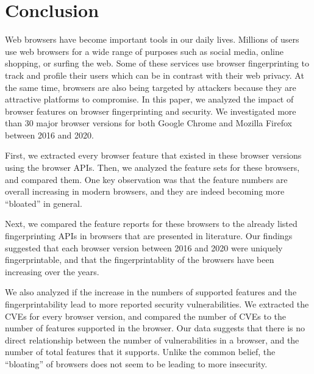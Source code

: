 \section{Conclusion}
\label{sec:conclusion}

Web browsers have become important tools in our daily lives.
Millions of users use web browsers for a wide range of purposes such
as social media, online shopping, or surfing the web. Some of these
services use browser fingerprinting to track and profile their users
which can be in contrast with their web privacy. At the same time,
browsers are also being targeted by attackers because they are
attractive platforms to compromise. In this paper, we analyzed the
impact of browser features on browser fingerprinting and security. We
investigated more than 30 major browser versions for both Google
Chrome and Mozilla Firefox between 2016 and 2020.

First, we extracted every browser feature that existed in these
browser versions using the browser APIs. Then, we analyzed the feature
sets for these browsers, and compared them. One key observation was
that the feature numbers are overall increasing in modern browsers,
and they are indeed becoming more ``bloated'' in general.

Next, we compared the feature reports for these browsers to the
already listed fingerprinting APIs in browsers that are presented in
literature. Our findings suggested that each browser version between 2016
and 2020 were uniquely fingerprintable, and that the fingerprintablity
of the browsers have been increasing over the years.

We also analyzed if the increase in the numbers of supported features
and the fingerprintability lead to more reported security
vulnerabilities. We extracted the CVEs for every browser version, and
compared the number of CVEs to the number of features supported in the
browser. Our data suggests that there is no direct relationship
between the number of vulnerabilities in a browser, and the number of
total features that it supports. Unlike the common belief, the
``bloating'' of browsers does not seem to be leading to more
insecurity.
